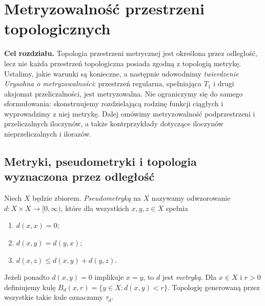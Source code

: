 \chapter{Metryzowalność przestrzeni topologicznych}
\label{ch:topog-metryzowalnosc}

\noindent\textbf{Cel rozdziału.}
Topologia przestrzeni metrycznej jest określona przez odległość,
lecz nie każda przestrzeń topologiczna posiada zgodną z topologią
metrykę. Ustalimy, jakie warunki są konieczne, a następnie
udowodnimy \emph{twierdzenie Urysohna o metryzowalności}:
przestrzeń regularna, spełniająca $T_1$ i drugi aksjomat
przeliczalności, jest metryzowalna. Nie ograniczymy się do
samego sformułowania: skonstruujemy rozdzielającą rodzinę funkcji
ciągłych i wyprowadzimy z niej metrykę. Dalej omówimy
metryzowalność podprzestrzeni i przeliczalnych iloczynów,
a także kontrprzykłady dotyczące iloczynów nieprzeliczalnych
i ilorazów.

\section{Metryki, pseudometryki i topologia wyznaczona przez odległość}
\label{sec:topog-metryki-definicje}

\begin{definicja}
\label{def:topog-pseudometryka-metryka}
Niech $X$ będzie zbiorem. \emph{Pseudometryką} na $X$
nazywamy odwzorowanie $d\colon X\times X\to[0,\infty)$,
które dla wszystkich $x,y,z\in X$ spełnia
\begin{enumerate}[label=(\roman*)]
\item $d(x,x)=0$;
\item $d(x,y)=d(y,x)$;
\item $d(x,z)\le d(x,y)+d(y,z)$.
\end{enumerate}
Jeżeli ponadto $d(x,y)=0$ implikuje $x=y$, to $d$ jest
\emph{metryką}. Dla $x\in X$ i $r>0$ definiujemy kulę
$B_d(x,r)=\{y\in X:d(x,y)<r\}$.
Topologię generowaną przez wszystkie takie kule oznaczamy
$\tau_d$.
\end{definicja}

